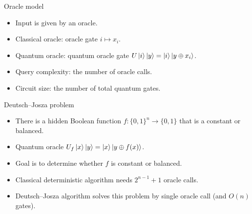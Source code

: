 \documentclass{beamer}
\newcommand\emm[1]{\textcolor{redorange}{{#1}}}
\begin{document}
\begin{frame}{Oracle model}

\begin{itemize}
\setlength{\itemsep}{2em}
\item Input is given by an oracle.
\item Classical oracle: oracle gate $i\mapsto x_i$.
\item Quantum oracle: quantum oracle gate $U\ket{i}\ket{y} = \ket{i}\ket{y\oplus x_i}$.
\item Query complexity: the number of oracle calls.
\item Circuit size: the number of total quantum gates.
\end{itemize}
\end{frame}

\begin{frame}{Deutsch--Josza problem}
\begin{itemize}
\setlength{\itemsep}{2em}
\item There is a hidden Boolean function $f\colon\{0,1\}^n\to\{0,1\}$ that is a \emm{constant or balanced}.
\item Quantum oracle $U_f\ket{x}\ket{y} = \ket{x}\ket{y\oplus f(x)}$.
\item Goal is to determine whether $f$ is constant or balanced.
\item Classical deterministic algorithm needs $2^{n-1}+1$ oracle calls.
\item Deutsch--Josza algorithm solves this problem by \emm{single} oracle call (and $O(n)$ gates).
\end{itemize}
\end{frame}
\end{document}
